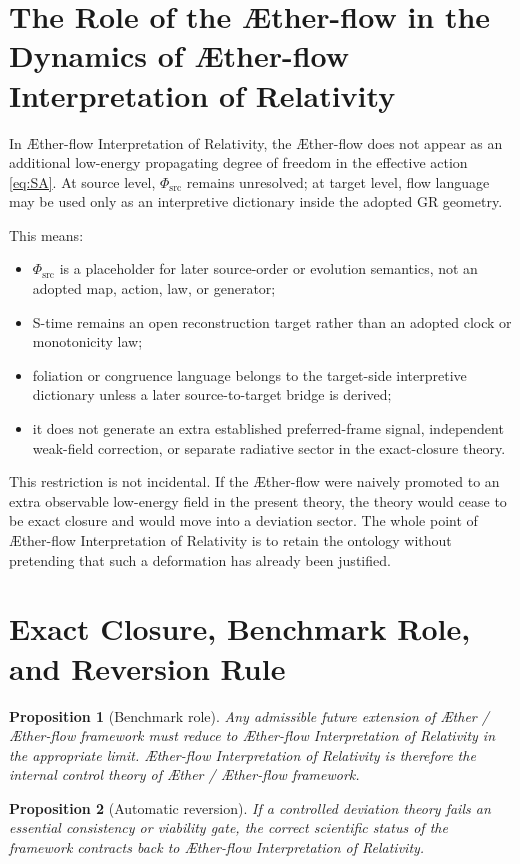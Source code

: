 \documentclass[11pt]{article}
\newcommand{\Aether}{\AE{}ther}
\newcommand{\Aflow}{\AE{}ther-flow}
\newcommand{\TheoryName}{\Aflow{} Interpretation of Relativity}
\newcommand{\TheoryProgram}{\Aether{} / \Aflow{} framework}
\newcommand{\PhiSrc}{\Phi_{\mathrm{src}}}
\newtheorem{proposition}{Proposition}
\begin{document}
\section{The Role of the \Aflow{} in the Dynamics of \TheoryName{}}

In \TheoryName{}, the \Aflow{} does not appear as an additional low-energy
propagating degree of freedom in the effective action \eqref{eq:SA}. At source
level, \(\PhiSrc\) remains unresolved; at target level, flow language may be
used only as an interpretive dictionary inside the adopted GR geometry.

This means:
\begin{itemize}
    \item \(\PhiSrc\) is a placeholder for later source-order or evolution semantics, not an adopted map, action, law, or generator;
    \item S-time remains an open reconstruction target rather than an adopted clock or monotonicity law;
    \item foliation or congruence language belongs to the target-side interpretive dictionary unless a later source-to-target bridge is derived;
    \item it does not generate an extra established preferred-frame signal, independent weak-field correction, or separate radiative sector in the exact-closure theory.
\end{itemize}

This restriction is not incidental. If the \Aflow{} were naively promoted to an extra observable low-energy field in the present theory, the theory would cease to be exact closure and would move into a deviation sector. The whole point of \TheoryName{} is to retain the ontology without pretending that such a deformation has already been justified.

\section{Exact Closure, Benchmark Role, and Reversion Rule}

\begin{proposition}[Benchmark role]
Any admissible future extension of \TheoryProgram{} must reduce to \TheoryName{} in the appropriate limit. \TheoryName{} is therefore the internal control theory of \TheoryProgram{}.
\end{proposition}

\begin{proposition}[Automatic reversion]
If a controlled deviation theory fails an essential consistency or viability gate, the correct scientific status of the framework contracts back to \TheoryName{}.
\end{proposition}
\end{document}
